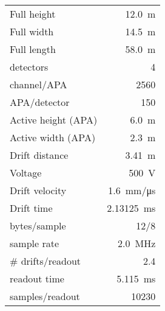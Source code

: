 
\begin{tabular}[h]{l|r}
\hline
Full height & \SI{12.0}{\meter} \\
Full width & \SI{14.5}{\meter} \\
Full length & \SI{58.0}{\meter} \\
detectors & \num{4} \\
\hline
channel/APA & \num{2560} \\
APA/detector & \num{150} \\
Active height (APA) & \SI{6.0}{\meter} \\
Active width (APA) & \SI{2.3}{\meter} \\
Drift distance & \SI{3.41}{\meter} \\
Voltage & \SI{500}{\volt} \\
\hline
Drift velocity & \SI{1.6}{\milli\meter / \micro\second} \\
Drift time & \SI{2.13125}{\milli\second} \\
\hline
bytes/sample & \num{12}/\num{8} \\
sample rate & \SI{2.0}{\mega\hertz} \\
\# drifts/readout & \num{2.4} \\
\hline
readout time & \SI{5.115}{\milli\second} \\
samples/readout & \num{10230} \\
\hline
\end{tabular}

